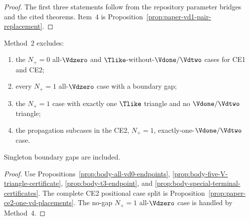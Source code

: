 \begin{proof}
The first three statements follow from the repository parameter bridges and
the cited theorems.  Item~4
is Proposition~\ref{prop:paper-vd1-pair-replacement}.
\end{proof}

\begin{proposition}
\label{prop:body-demand-branches}
Method~2 excludes:
\begin{enumerate}
\item the $N_+=0$ all-$\Vdzero$ and
$\Tlike$-without-$\Vdone/\Vdtwo$ cases for CE1 and CE2;
\item every $N_+=1$ all-$\Vdzero$ case with a boundary gap;
\item the $N_+=1$ case with exactly one $\Tlike$ triangle and no
$\Vdone/\Vdtwo$ triangle;
\item the propagation subcases in the CE2, $N_+=1$,
exactly-one-$\Vdone/\Vdtwo$ case.
\end{enumerate}
Singleton boundary gaps are included.
\end{proposition}

\begin{proof}
Use Propositions~\ref{prop:body-all-vd0-endpoints},
\ref{prop:body-five-V-triangle-certificate},
\ref{prop:body-t3-endpoint}, and
\ref{prop:body-special-terminal-certificates}.  The complete CE2 positional
case split is Proposition~\ref{prop:paper-ce2-one-vd-placements}.  The no-gap
$N_+=1$ all-$\Vdzero$ case is handled by Method~4.
\end{proof}

